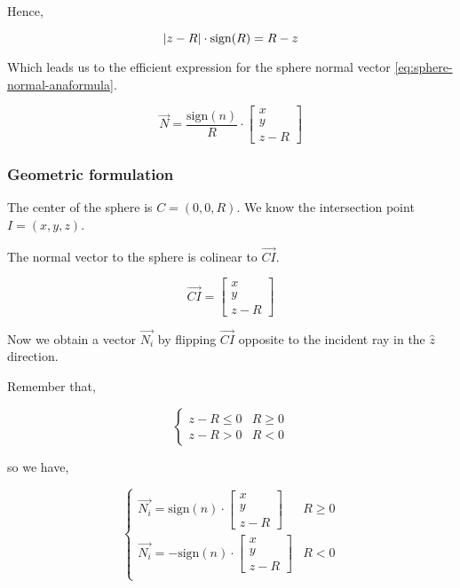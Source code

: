 Hence,

\begin{equation}
\abs{z-R} \cdot \textrm{sign}(R) = R - z
\end{equation}

Which leads us to the efficient expression for the sphere normal vector
\cref{eq:sphere-normal-anaformula}.

\begin{equation} \label{eq:sphere-normal-anaformula}
\overrightarrow{N} = \frac{\textrm{sign}(n)}{R} \cdot
\begin{bmatrix}
x \\ y \\ z - R
\end{bmatrix}
\end{equation}

\subsubsection{Geometric formulation}
The center of the sphere is $C = (0, 0, R)$. We know the intersection point
$I = (x, y, z)$.

The normal vector to the sphere is colinear to $\overrightarrow{CI}$.

\begin{equation}
\overrightarrow{CI} = \begin{bmatrix} x \\ y \\ z - R \end{bmatrix}
\end{equation}

Now we obtain a vector $\overrightarrow{N_i}$ by flipping $\overrightarrow{CI}$
opposite to the incident ray in the $\hat{z}$ direction.

Remember that,

\begin{equation} \begin{cases}
z - R \leq 0 & R \geq 0 \\
z - R > 0 & R < 0
\end{cases} \end{equation}

so we have,

\begin{equation} \begin{cases}
\overrightarrow{N_i} = \textrm{sign}(n) \cdot
\begin{bmatrix} x \\ y \\ z - R \end{bmatrix} & R \geq 0 \\
\overrightarrow{N_i} = - \textrm{sign}(n) \cdot
\begin{bmatrix} x \\ y \\ z - R \end{bmatrix} & R < 0 \\
\end{cases} \end{equation}

